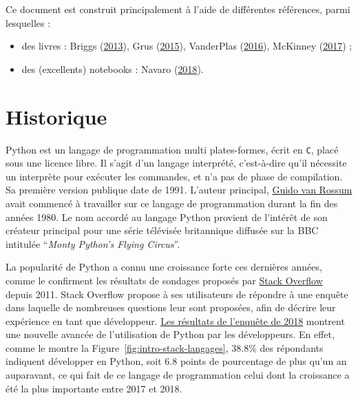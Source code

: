 \documentclass[12pt,]{book}
\providecommand{\tightlist}{%
  \setlength{\itemsep}{0pt}\setlength{\parskip}{0pt}}
\numberwithin{equation}{section}
\numberwithin{countremarque}{section}
\begin{document}
Ce document est construit principalement à l'aide de différentes
références, parmi lesquelles :

\begin{itemize}
\tightlist
\item
  des livres : Briggs
  (\protect\hyperlink{ref-briggs_2013_python}{2013}), Grus
  (\protect\hyperlink{ref-grus_2015_data}{2015}), VanderPlas
  (\protect\hyperlink{ref-vanderplas2016python}{2016}), McKinney
  (\protect\hyperlink{ref-mckinney_2017_python}{2017}) ;
\item
  des (excellents) notebooks : Navaro
  (\protect\hyperlink{ref-navaro_python}{2018}).
\end{itemize}

\section{Historique}\label{historique}

Python est un langage de programmation multi plates-formes, écrit en
\texttt{C}, placé sous une licence libre. Il s'agit d'un langage
interprété, c'est-à-dire qu'il nécessite un interprète pour exécuter les
commandes, et n'a pas de phase de compilation. Sa première version
publique date de 1991. L'auteur principal,
\href{https://en.wikipedia.org/wiki/Guido_van_Rossum}{Guido van Rossum}
avait commencé à travailler sur ce langage de programmation durant la
fin des années 1980. Le nom accordé au langage Python provient de
l'intérêt de son créateur principal pour une série télévisée britannique
diffusée sur la BBC intitulée ``\emph{Monty Python's Flying Circus}''.

La popularité de Python a connu une croissance forte ces dernières
années, comme le confirment les résultats de sondages proposés par
\href{https://stackoverflow.com/}{Stack Overflow} depuis 2011. Stack
Overflow propose à ses utilisateurs de répondre à une enquête dans
laquelle de nombreuses questions leur sont proposées, afin de décrire
leur expérience en tant que développeur.
\href{https://insights.stackoverflow.com/survey/2018\#technology}{Les
résultats de l'enquête de 2018} montrent une nouvelle avancée de
l'utilisation de Python par les développeurs. En effet, comme le montre
la Figure~\ref{fig:intro-stack-langages}, 38.8\% des répondants
indiquent développer en Python, soit 6.8 points de pourcentage de plus
qu'un an auparavant, ce qui fait de ce langage de programmation celui
dont la croissance a été la plus importante entre 2017 et 2018.
\end{document}
